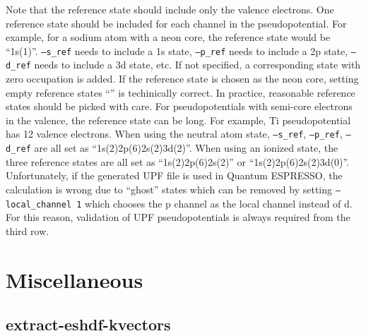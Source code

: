     Note that the reference state should include only the valence electrons.
    One reference state should be included for each channel in the pseudopotential.
    For example, for a sodium atom with a neon core, the reference state would be ``1s(1)''.
    \texttt{--s\_ref} needs to include a 1s state, \texttt{--p\_ref} needs to include a 2p state,
    \texttt{--d\_ref} needs to include a 3d state, etc. If not specified, a corresponding state with zero occupation is added.
    If the reference state is chosen as the neon core, setting empty reference states ``'' is techinically correct.
    In practice, reasonable reference states should be picked with care.
    For pseudopotentials with semi-core electrons in the valence, the reference state can be long.
    For example, Ti pseudopotential has 12 valence electrons. When using the neutral atom state,
    \texttt{--s\_ref}, \texttt{--p\_ref}, \texttt{--d\_ref} are all set as ``1s(2)2p(6)2s(2)3d(2)''.
    When using an ionized state, the three reference states are all set as ``1s(2)2p(6)2s(2)'' or ``1s(2)2p(6)2s(2)3d(0)''.
    Unfortunately, if the generated UPF file is used in Quantum ESPRESSO, the calculation is wrong due to ``ghost'' states
    which can be removed by setting \texttt{--local\_channel 1} which chooses the p channel as the local channel instead of d.
    For this reason, validation of UPF pseudopotentials is always required from the third row.

\section{Miscellaneous}
  \subsection{extract-eshdf-kvectors}
    

